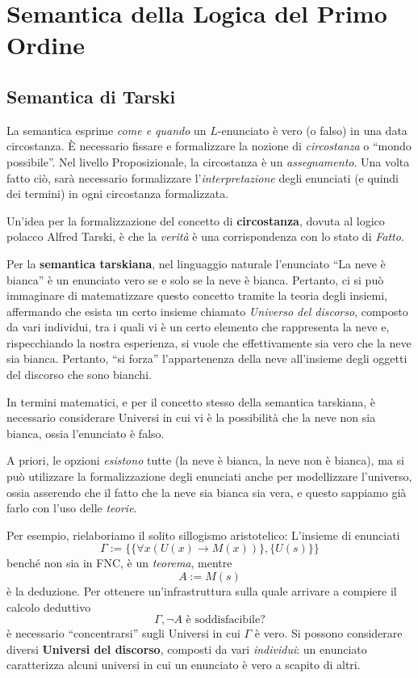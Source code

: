 \chapter{Semantica della Logica del Primo Ordine}
\section{Semantica di Tarski}
La semantica esprime \textit{come e quando} un $L$-enunciato è vero (o falso) in una data 
circostanza. \`E necessario fissare e formalizzare la  nozione di \textit{circostanza}
o ``mondo possibile''. Nel livello Proposizionale, la circostanza è un 
\textit{assegnamento}. Una volta fatto ciò, sarà necessario formalizzare 
l'\textit{interpretazione} degli enunciati (e quindi dei termini) in ogni circostanza 
formalizzata. 

Un'idea per la formalizzazione del concetto di 
\textbf{circostanza}, dovuta al logico polacco Alfred Tarski, 
è che la \textit{verità} è una corrispondenza con lo stato di \textit{Fatto}. 

Per la \textbf{semantica tarskiana}, nel linguaggio naturale l'enunciato
``La neve è bianca'' è un enunciato vero se e solo se la neve è bianca. 
Pertanto, ci si può immaginare di matematizzare questo concetto 
tramite la teoria degli insiemi, affermando che esista un certo 
insieme chiamato \textit{Universo del discorso}, composto da vari individui,
tra i quali vi è un certo elemento che rappresenta la neve e, 
rispecchiando la nostra esperienza, si vuole che effettivamente sia 
vero che la neve sia bianca. Pertanto, ``si forza'' l'appartenenza 
della neve all'insieme degli oggetti del discorso che sono bianchi. 

In termini matematici, e per il concetto stesso della semantica tarskiana, 
è necessario considerare Universi in cui vi è la possibilità 
che la neve non sia bianca, ossia l'enunciato è falso. 

A priori, le opzioni \textit{esistono} tutte (la neve è bianca, la neve 
non è bianca), ma si può utilizzare la formalizzazione degli enunciati 
anche per modellizzare l'universo, ossia asserendo che il fatto 
che la neve sia bianca sia vera, e questo sappiamo già farlo 
con l'uso delle \textit{teorie}. 

Per esempio, rielaboriamo il solito sillogismo aristotelico: 
L'insieme di enunciati 
$$
\Gamma := \{\{\forall x (U(x) \rightarrow M(x))\}, \{U(s)\}\}
$$
benché non sia in FNC, è un \textit{teorema}, mentre 
$$
A := M(s)
$$
è la deduzione. Per ottenere un'infrastruttura sulla quale arrivare a compiere 
il calcolo deduttivo 
$$
\Gamma, \neg A \text{ è soddisfacibile?}
$$
è necessario ``concentrarsi'' sugli Universi in cui $\Gamma$ è vero. 
Si possono considerare diversi \textbf{Universi del discorso}, composti da vari 
\textit{individui}: un enunciato caratterizza alcuni  universi in cui 
un enunciato è vero a scapito di altri. 


